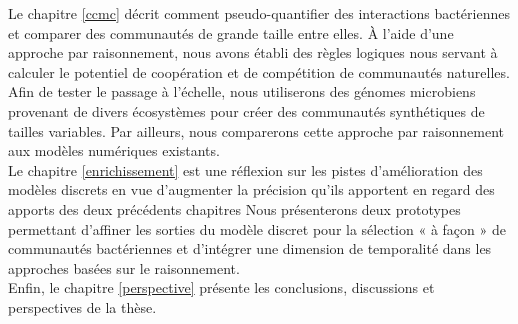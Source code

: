 Le chapitre \ref{ccmc} décrit comment pseudo-quantifier des interactions bactériennes et comparer des communautés de grande taille entre elles. À l'aide d'une approche par raisonnement, nous avons établi des règles logiques nous servant à calculer le potentiel de coopération et de compétition de communautés naturelles. Afin de tester le passage à l'échelle, nous utiliserons des génomes microbiens provenant de divers écosystèmes pour créer des communautés synthétiques de tailles variables. Par ailleurs, nous comparerons cette approche par raisonnement aux modèles numériques existants. \\



Le chapitre \ref{enrichissement} est une réflexion sur les pistes d’amélioration des modèles discrets en vue d’augmenter la précision qu’ils apportent en regard des apports des deux précédents chapitres Nous présenterons deux prototypes permettant d'affiner les sorties du modèle discret pour la sélection « à façon » de communautés bactériennes et d’intégrer une dimension de temporalité dans les approches basées sur le raisonnement. \\

Enfin, le chapitre \ref{perspective} présente les conclusions, discussions et perspectives de la thèse.



